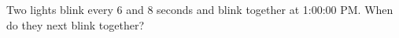Two lights blink every $6$ and $8$ seconds and blink together at 1:00:00 PM. When do they next blink together?
